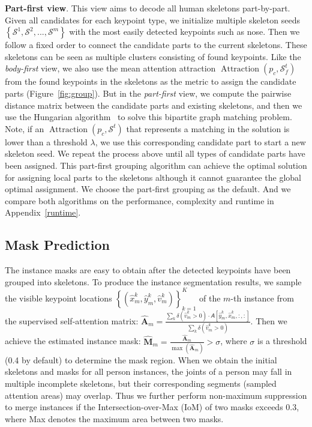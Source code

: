 \documentclass{article} \usepackage{iclr_conference,times}
\newcommand{\tens}[1]{\bm{\mathsfit{#1}}}
\def\tA{{\tens{A}}}
\begin{document}
\textbf{Part-first view}. This view aims to decode all human skeletons part-by-part. 
Given all candidates for each keypoint type, we initialize multiple skeleton seeds $\left\{\mathcal{S}^1, \mathcal{S}^2, ..., \mathcal{S}^m\right\}$ with the most easily detected keypoints such as nose. Then we follow a fixed order to connect the candidate parts to the current skeletons. These skeletons can be seen as multiple clusters consisting of found keypoints. 
 Like the \emph{body-first} view, we also use the mean attention attraction $\operatorname{Attraction}(p_c, \mathcal{S}^t_f)$ from the found keypoints in the skeletons as the metric to assign the candidate parts (Figure~\ref{fig:group}). But in the \emph{part-first} view, we compute the pairwise distance matrix between the candidate parts and existing skeletons, and then we use the Hungarian algorithm~\citep{hungarian:kuhn1955hungarian} to solve this bipartite graph matching problem. Note, if an $\operatorname{Attraction}(p_c, \mathcal{S}^t)$ that represents a matching in the solution is lower than a threshold $\lambda$, we use this corresponding candidate part to start a new skeleton seed. We repeat the process above until all types of candidate parts have been assigned. This part-first grouping algorithm can achieve the optimal solution for assigning local parts to the skeletons although it cannot guarantee the global optimal assignment. We choose the part-first grouping as the default. And we compare both algorithms on the performance, complexity and runtime in Appendix~\ref{runtime}. 
 
 
 \subsection{Mask Prediction}
The instance masks are easy to obtain after the detected keypoints have been grouped into skeletons. To produce the instance segmentation results, we sample the visible keypoint locations $\left\{(\hat{x}_m^k,\hat{y}_m^k,\hat{v}_m^k)\right\}_{k=1}^K$ of the $m$-th instance from the supervised self-attention matrix:
$\hat{\mathbf{A}}_m=\frac{\sum_{k}\delta(\hat{v}_m^k>0) \cdot \tA[\hat{y}_m^k,\hat{x}_m^k,:,:]}{\sum_{k}\delta(\hat{v}_m^k>0)}$. Then we achieve the estimated instance mask: $\hat{\mathbf{M}}_m=\frac{\hat{\mathbf{A}}_m}{\operatorname{max}(\hat{\mathbf{A}}_m)}>\sigma$, where $\sigma$ is a threshold (0.4 by default) to determine the mask region. When we obtain the initial skeletons and masks for all person instances, the joints of a person may fall in multiple incomplete skeletons, but their corresponding segments (sampled attention areas) may overlap. Thus we further perform non-maximum suppression to merge instances if the Intersection-over-Max (IoM) of two masks exceeds 0.3, where Max denotes the maximum area between two masks.
\end{document}
